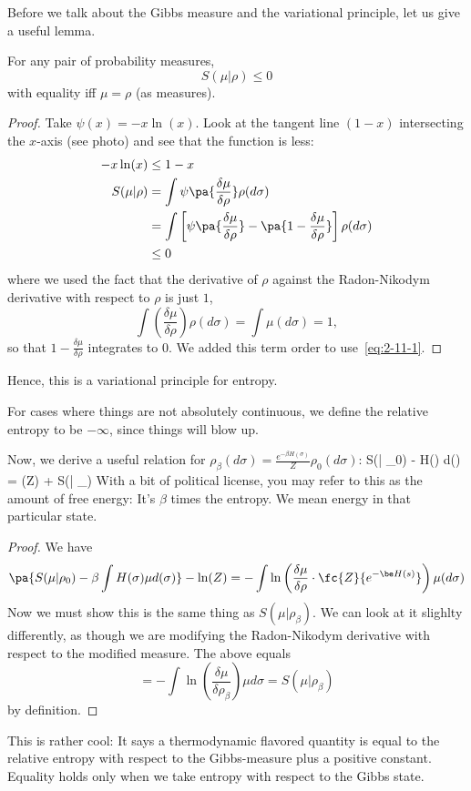 Before we talk about the Gibbs measure and the variational principle, let us give a useful lemma.

\begin{lem} For any pair of probability measures, %
\[
S(\mu | \rho) \leq 0
\]
with equality iff $\mu = \rho$ (as measures).
\end{lem}
\begin{proof}
Take $\psi(x) = -x\ln(x)$. Look at the tangent line $(1 - x)$ intersecting the $x$-axis (see photo) and see that the function is less: 
\begin{align}
-x \ln(x) &\leq 1 - x
\label{eq:2-11-1}
\\
\nonumber
S(\mu | \rho) &= 
\int  \psi\pa{\frac{\delta\mu}{\delta\rho}} \rho(d\sigma)\\
\nonumber
&=\int \left[ \psi\pa{\frac{\delta\mu}{\delta\rho}} - \pa{1 - \frac{\delta\mu}{\delta\rho}}\right]\rho(d\sigma)\\
\nonumber &\leq 0
\end{align}
where we used the fact that the derivative of $\rho$ against the Radon-Nikodym derivative with respect to $\rho$ is just $1$, \[\int \left(\frac{\delta \mu}{\delta \rho} \right) \rho (d\sigma )= \int \mu (d\sigma) = 1,\] 
so that $1-\frac{\delta\mu}{\delta\rho}$ integrates to $0$. We added this term order to use~\eqref{eq:2-11-1}. 
\end{proof}
Hence, this is a variational principle for entropy. 

\begin{rem}
For cases where things are not absolutely continuous, we define the relative entropy to be $-\infty$, since things will blow up. 
\end{rem}

Now, we derive a useful relation for  $\rho_{\beta}(d\sigma)  = \frac{e^{-\beta H(\sigma)}}{Z} \rho_0 (d\sigma)$:
S(\mu | \rho_0) - \beta \int H(\sigma) \mu d(\sigma) = \ln(Z) + S(\mu | \rho_{\beta})
\eeq
With a bit of political license, you may refer to this as the amount of free energy: It's $\beta$ times the entropy. We mean energy in that particular state. 
\begin{proof}
We have
\[
\pa{S(\mu | \rho_0) - \beta \int H(\sigma) \mu d(\sigma)} - \ln (Z)=
-\int \ln\left(\frac{\delta\mu}{\delta\rho}\cdot \fc{Z}{e^{-\be H(s)}}\right) \mu (d\sigma )
\]
Now we must show this is the same thing as $S(\mu | \rho_{\beta})$. We can look at it slighlty differently, as though we are modifying the Radon-Nikodym derivative with respect to the modified measure. The above equals
\[
= -\int \ln\left(\frac{\delta\mu}{\delta\rho_{\beta}}\right) \mu d\sigma = S(\mu|\rho_{\beta})
\]
by definition. 
\end{proof}
This is rather cool: It says a thermodynamic flavored quantity is equal to the relative entropy with respect to the Gibbs-measure plus a positive constant. Equality holds only when we take entropy with respect to the Gibbs state. %

